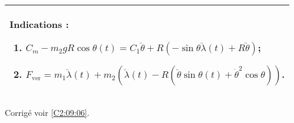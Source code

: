 \ifprof
\else
\ifcolle
\else

\footnotesize
\begin{center}
\begin{tabular}{|p{.9\linewidth}|}
\hline
Indications :
\begin{enumerate}
\item $ C_m-m_2 g R  \cos\theta(t) = C_1  \ddot{\theta} + R\left( -\sin \theta \ddot{\lambda}(t) + R \ddot{\theta} \right)$;
\item $F_{\text{ver}}=m_1\ddot{\lambda}(t)+m_2\left(\ddot{\lambda}(t)- R \left(\ddot{\theta} \sin\theta(t)  + \dot{\theta}^2 \cos\theta \right)\right)$. 
\end{enumerate} \\ \hline
\end{tabular}
\end{center}
\normalsize
\fi

\begin{flushright}
\footnotesize{Corrigé  voir \ref{C2:09:06}.}
\end{flushright}%
\fi